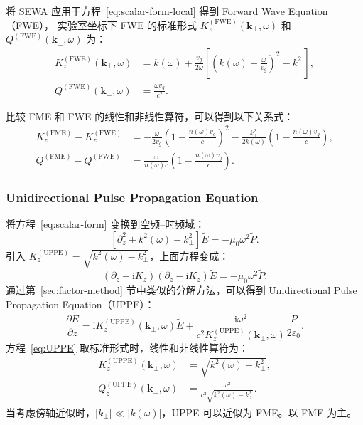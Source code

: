 \documentclass[a4paper,12pt]{ctexart}
\numberwithin{equation}{section}
\newcommand{\vect}[1]{\bm{#1}}
\begin{document}
将 SEWA 应用于方程~\eqref{eq:scalar-form-local} 得到 Forward Wave Equation（FWE），
实验室坐标下 FWE 的标准形式 $K_z^{(\mathrm{FWE})}(\vect{k}_\perp,\omega)$ 和
$Q^{(\mathrm{FWE})}(\vect{k}_\perp,\omega)$ 为：
\begin{equation}
  \begin{aligned}
    K_z^{(\mathrm{FWE})}(\vect{k}_\perp,\omega)
     & =k(\omega)+\frac{v_g}{2\omega}
    \left[\left(k(\omega)-\frac{\omega}{v_g}\right)^2-k_\perp^2\right], \\
    Q^{(\mathrm{FWE})}(\vect{k}_\perp,\omega)
     & =\frac{\omega v_g}{c^2}.
  \end{aligned}
  \label{eq:FWE}
\end{equation}

比较 FME 和 FWE 的线性和非线性算符，可以得到以下关系式：
\begin{equation}
  \begin{aligned}
    K_z^{(\mathrm{FME})}-K_z^{(\mathrm{FWE})}
     & =-\frac{\omega}{2v_g}\left(1-\frac{n(\omega)v_g}{c}\right)^2
    -\frac{k_\perp^2}{2k(\omega)}
    \left(1-\frac{n(\omega)v_g}{c}\right),                              \\
    Q^{(\mathrm{FME})}-Q^{(\mathrm{FWE})}
     & =\frac{\omega}{n(\omega)c}\left(1-\frac{n(\omega)v_g}{c}\right).
  \end{aligned}
  \label{eq:compare}
\end{equation}

\subsubsection{Unidirectional Pulse Propagation Equation}
将方程~\eqref{eq:scalar-form} 变换到空频--时频域：
\begin{equation}
  \left[\partial_z^2+k^2(\omega)-k_\perp^2\right]\tilde{E}
  =-\mu_0\omega^2\tilde{P}.
\end{equation}
引入 $K_z^{(\mathrm{UPPE})}=\sqrt{k^2(\omega)-k_\perp^2}$，上面方程变成：
\begin{equation}
  (\partial_z+\mathrm{i}K_z)(\partial_z-\mathrm{i}K_z)\tilde{E}
  =-\mu_0\omega^2\tilde{P}.
\end{equation}
通过第~\ref{sec:factor-method} 节中类似的分解方法，可以得到
Unidirectional Pulse Propagation Equation（UPPE）：
\begin{equation}
  \frac{\partial\tilde{E}}{\partial z}
  =\mathrm{i}K_z^{(\mathrm{UPPE})}(\vect{k}_\perp,\omega)\tilde{E}
  +\frac{\mathrm{i}\omega^2}
  {c^2K_z^{(\mathrm{UPPE})}(\vect{k}_\perp,\omega)}
  \frac{\tilde{P}}{2\varepsilon_0}.
  \label{eq:UPPE}
\end{equation}
方程~\eqref{eq:UPPE} 取标准形式时，线性和非线性算符为：
\begin{equation}
  \begin{aligned}
    K_z^{(\mathrm{UPPE})}(\vect{k}_\perp,\omega)
     & =\sqrt{k^2(\omega)-k_\perp^2},                     \\
    Q_z^{(\mathrm{UPPE})}(\vect{k}_\perp,\omega)
     & =\frac{\omega^2}{c^2\sqrt{k^2(\omega)-k_\perp^2}}.
  \end{aligned}
  \label{eq:UPPE-canonical}
\end{equation}
当考虑傍轴近似时，$|k_\perp|\ll|k(\omega)|$，UPPE 可以近似为 FME。以 FME 为主。
\end{document}
